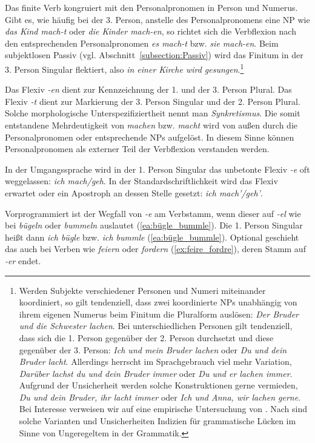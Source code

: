 \largerpage[-5]
Das finite Verb kongruiert mit den Personalpronomen in Person und Numerus. Gibt es, wie häufig bei der 3. Person, anstelle des Personalpronomens eine NP wie \textit{das Kind mach-t} oder \textit{die Kinder mach-en}, so richtet sich die Verbflexion nach den entsprechenden Personalpronomen \textit{es mach-t} bzw. \textit{sie mach-en}. Beim subjektlosen Passiv (vgl. Abschnitt~\ref{subsection:Passiv}) wird das Finitum in der 3. Person Singular flektiert, also \zB \textit{in einer Kirche wird gesungen}.\footnote{Werden Subjekte verschiedener Personen und Numeri miteinander koordiniert, so gilt tendenziell, dass zwei koordinierte NPs unabhängig von ihrem eigenen Numerus beim Finitum die Pluralform auslösen: \textit{Der Bruder und die Schwester lachen}. Bei unterschiedlichen Personen gilt tendenziell, dass sich die 1. Person gegenüber der 2. Person durchsetzt und diese gegenüber der 3. Person: \textit{Ich und mein Bruder lachen} oder \textit{Du und dein Bruder lacht}. Allerdings herrscht im Sprachgebrauch viel mehr Variation, \zB \textit{Darüber lachst du und dein Bruder immer} oder \textit{Du und er lachen immer}. Aufgrund der Unsicherheit werden solche Konstruktionen gerne vermieden, \zB \textit{Du und dein Bruder, ihr lacht immer} oder \textit{Ich und Anna, wir lachen gerne}. Bei Interesse verweisen wir auf eine empirische Untersuchung von \citet{Fuss2018}. Nach \citet[261--266]{Reis2017} sind solche Varianten und Unsicherheiten Indizien für grammatische Lücken im Sinne von Ungeregeltem in der Grammatik.}

Das Flexiv \textit{-en} dient zur Kennzeichnung der 1. und der 3. Person Plural. Das Flexiv \textit{-t} dient zur Markierung der 3. Person Singular und der 2. Person Plural. Solche morphologische Unterspezifiziertheit nennt man \textit{Synkretismus}. Die somit entstandene Mehrdeutigkeit von \textit{machen} bzw. \textit{macht} wird von außen durch die Personalpronomen oder entsprechende NPs aufgelöst. In diesem Sinne können Personalpronomen als externer Teil der Verbflexion verstanden werden.

In der Umgangssprache wird in der 1. Person Singular das unbetonte Flexiv \textit{-e} oft weggelassen: \textit{ich mach/geh}. In der Standardschriftlichkeit wird das Flexiv erwartet oder ein Apostroph an dessen Stelle gesetzt: \textit{ich mach'/geh'}.

Vorprogrammiert ist der Wegfall von \textit{-e} am Verbstamm, wenn dieser auf \textit{-el} wie bei \textit{bügeln} oder \textit{bummeln} auslautet (\ref{ea:bügle_bummle}). Die 1. Person Singular heißt dann \textit{ich bügle} bzw. \textit{ich bummle} (\ref{ea:bügle_bummle}). Optional geschieht das auch bei Verben wie \textit{feiern} oder \textit{fordern}  (\ref{ex:feire_fordre}), deren Stamm auf \textit{-er} endet. 

